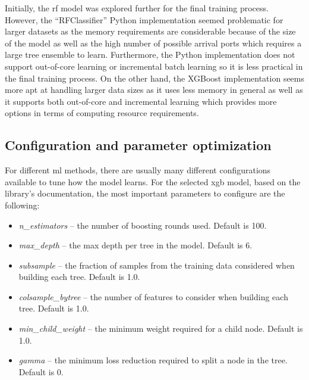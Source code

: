 Initially, the \acrshort{rf} model was explored further for the final training process. However, the ``RFClassifier'' Python implementation seemed problematic for larger datasets as the memory requirements are considerable because of the size of the model as well as the high number of possible arrival ports which requires a large tree ensemble to learn. Furthermore, the Python implementation does not support out-of-core learning or incremental batch learning so it is less practical in the final training process. On the other hand, the XGBoost implementation seems more apt at handling larger data sizes as it uses less memory in general as well as it supports both out-of-core and incremental learning which provides more options in terms of computing resource requirements.

\subsection{Configuration and parameter optimization}

For different \acrshort{ml} methods, there are usually many different configurations available to tune how the model learns. For the selected \acrfull{xgb} model, based on the library's documentation, the most important parameters to configure are the following:

\begin{itemize}
    \item \textit{n\_estimators} -- the number of boosting rounds used. Default is 100.
    \item \textit{max\_depth} -- the max depth per tree in the model. Default is 6.
    \item \textit{subsample} -- the fraction of samples from the training data considered when building each tree. Default is 1.0.
    \item \textit{colsample\_bytree} -- the number of features to consider when building each tree. Default is 1.0.
    \item \textit{min\_child\_weight} -- the minimum weight required for a child node. Default is 1.0.
    \item \textit{gamma} -- the minimum loss reduction required to split a node in the tree. Default is 0.
\end{itemize}

